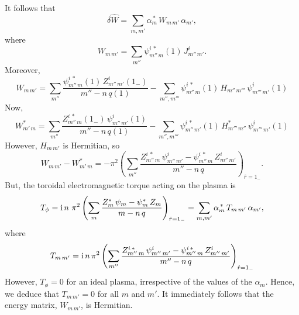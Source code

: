 \documentclass[12pt,prb,aps,notitlepage]{revtex4-1}
\begin{document}
It follows that
\begin{equation}
\delta \hat{W} = \sum_{m,m'} \alpha_m^{\,\ast}\,W_{m\,m'}\,\alpha_{m'},
\end{equation}
where
\begin{equation}
W_{m\,m'} =\sum_{m''} \psi_{m''\,m}^{i\,\ast}(1)\,J_{m''\,m'}^i.
\end{equation}
Moreover, 
\begin{equation}
W_{m\,m'} =\sum_{m''}\frac{\psi_{m''\,m}^{i\,\ast}(1)\,Z_{m''\,m'}^i(1_-)}{m''-n\,q(1)}
-\sum_{m'',m'''}\psi_{m''\,m}^{i\,\ast}(1)\,H_{m''\,m'''}\,\psi^i_{m'''\,m'}(1)
\end{equation}
Now,
\begin{equation}
W_{m'\,m}^\ast =\sum_{m''}\frac{Z_{m''\,m}^{i\,\ast}(1_-)\,\psi_{m''\,m'}^i(1)}{m''-n\,q(1)}
-\sum_{m'',m'''}\psi_{m''\,m'}^{i\,\ast}(1)\,H^\ast_{m'''\,m''}\,\psi^i_{m'''\,m'}(1)
\end{equation}
However, $H_{m\,m'}$ is Hermitian, so
\begin{equation}
W_{m\,m'}-W_{m'\,m}^\ast =-\pi^2\left(\sum_{m''} \frac{Z_{m''\,m}^{i\,\ast}\,\psi_{m''\,m'}^i -\psi_{m''\,m}^{i\,\ast}\,Z_{m''\,m'}^i}{m''-n\,q}\right)_{\hat{r}=1_-}.
\end{equation}
But, the toroidal electromagnetic torque acting on the plasma is
\begin{equation}
T_\phi={\rm i}\,n\,\,\pi^2\left(\sum_m\frac{Z_m^\ast\,\psi_m-\psi_m^\ast\,Z_m}{m-n\,q}\right)_{\hat{r}=1_{-}}=\sum_{m,m'}\alpha_m^{\,\ast}\,T_{m\,m'}\,\alpha_{m'},
\end{equation}
where
\begin{equation}
T_{m\,m'} = {\rm i}\,n\,\pi^2\left(\sum_{m''} \frac{Z_{m''\,m}^{i\,\ast}\,\psi_{m''\,m'}^i -\psi_{m''\,m}^{i\,\ast}\,Z_{m''\,m'}^i}{m''-n\,q}\right)_{\hat{r}=1_-}
\end{equation}
However, $T_\phi=0$ for an ideal plasma, irrespective of the values of the $\alpha_m$. Hence, we deduce that $T_{m\,m'}=0$ for all
$m$ and $m'$. It immediately follows that the energy matrix, $W_{m\,m'}$, is Hermitian. 
\end{document}
